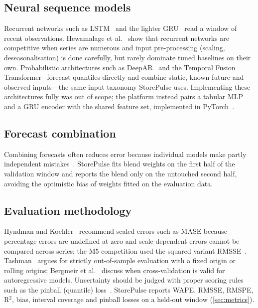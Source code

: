 \documentclass[conference]{IEEEtran}
\begin{document}
\subsection{Neural sequence models}
Recurrent networks such as LSTM~\cite{hochreiter1997lstm} and the lighter GRU~\cite{cho2014gru}
read a window of recent observations. Hewamalage et al.~\cite{hewamalage2021rnn} show that
recurrent networks are competitive when series are numerous and input pre-processing (scaling,
deseasonalisation) is done carefully, but rarely dominate tuned baselines on their own. Probabilistic
architectures such as DeepAR~\cite{salinas2020deepar} and the Temporal Fusion
Transformer~\cite{lim2021tft} forecast quantiles directly and combine static, known-future and
observed inputs---the same input taxonomy StorePulse uses. Implementing these architectures fully was
out of scope; the platform instead pairs a tabular MLP and a GRU encoder with the shared feature set,
implemented in PyTorch~\cite{paszke2019pytorch}.

\subsection{Forecast combination}
Combining forecasts often reduces error because individual models make partly independent
mistakes~\cite{bates1969combination}. StorePulse fits blend weights on the first half of the
validation window and reports the blend only on the untouched second half, avoiding the optimistic
bias of weights fitted on the evaluation data.

\subsection{Evaluation methodology}
Hyndman and Koehler~\cite{hyndman2006another} recommend scaled errors such as MASE because
percentage errors are undefined at zero and scale-dependent errors cannot be compared across series;
the M5 competition used the squared variant RMSSE~\cite{makridakis2022m5}. Tashman~\cite{tashman2000outofsample}
argues for strictly out-of-sample evaluation with a fixed origin or rolling origins; Bergmeir et
al.~\cite{bergmeir2018cv} discuss when cross-validation is valid for autoregressive models.
Uncertainty should be judged with proper scoring rules such as the pinball (quantile)
loss~\cite{gneiting2007proper,koenker1978quantiles}. StorePulse reports WAPE, RMSSE, RMSPE, R$^2$,
bias, interval coverage and pinball losses on a held-out window (\cref{sec:metrics}).
\end{document}

